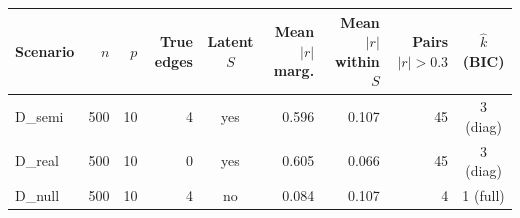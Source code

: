 \begin{tabular}{lrrrcrrrc}
\toprule
Scenario & $n$ & $p$ & True edges & Latent $S$ & Mean $|r|$ marg. & Mean $|r|$ within $S$ & Pairs $|r|>0.3$ & $\hat{k}$ (BIC) \\
\midrule
D\_semi & 500 & 10 & 4 & yes & 0.596 & 0.107 & 45 & 3 (diag) \\
D\_real & 500 & 10 & 0 & yes & 0.605 & 0.066 & 45 & 3 (diag) \\
D\_null & 500 & 10 & 4 & no & 0.084 & 0.107 & 4 & 1 (full) \\
\bottomrule
\end{tabular}
